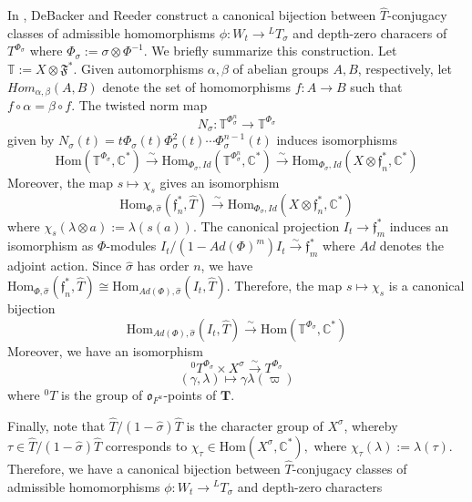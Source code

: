 \documentclass[11pt]{amsart}
\theoremstyle{plain}
\begin{document}
In \cite[Chapter 4]{debackerreeder}, DeBacker and Reeder construct a canonical bijection between $\hat{T}$-conjugacy classes of admissible homomorphisms $\phi : W_t \rightarrow {}^L T_{\sigma}$ and depth-zero characers of $T^{\Phi_{\sigma}}$ where $\Phi_{\sigma} := \sigma \otimes \Phi^{-1}$.  We briefly summarize this construction. Let $\mathbb{T} := X \otimes \mathfrak{F}^*$.  Given automorphisms $\alpha, \beta$ of abelian groups $A,B$, respectively, let $Hom_{\alpha, \beta}(A,B)$ denote the set of homomorphisms $f : A \rightarrow B$ such that $f \circ \alpha = \beta \circ f$.  The twisted norm map $$N_{\sigma} : \mathbb{T}^{\Phi_{\sigma}^n} \rightarrow \mathbb{T}^{\Phi_{\sigma}}$$ given by $N_{\sigma}(t) = t \Phi_{\sigma}(t) \Phi_{\sigma}^2(t) \cdots \Phi_{\sigma}^{n-1}(t)$ induces isomorphisms $$\mathrm{Hom}(\mathbb{T}^{\Phi_{\sigma}}, \mathbb{C}^*) \stackrel{\sim}{\rightarrow}  \mathrm{Hom}_{\Phi_{\sigma}, Id}(\mathbb{T}^{\Phi_{\sigma}^n}, \mathbb{C}^*) \stackrel{\sim}{\rightarrow} \mathrm{Hom}_{\Phi_{\sigma}, Id}(X \otimes \mathfrak{f}_n^*, \mathbb{C}^*)$$
Moreover, the map $s \mapsto \chi_s$ gives an isomorphism $$\mathrm{Hom}_{\Phi, \hat{\sigma}}(\mathfrak{f}_n^*, \hat{T}) \stackrel{\sim}{\rightarrow} \mathrm{Hom}_{\Phi_{\sigma}, Id}(X \otimes \mathfrak{f}_n^*, \mathbb{C}^*)$$ where $\chi_s(\lambda \otimes a) := \lambda(s(a))$.  The canonical projection $I_t \rightarrow \mathfrak{f}_m^*$ induces an isomorphism as $\Phi$-modules $I_t / (1 - Ad (\Phi)^m)I_t \stackrel{\sim}{\rightarrow} \mathfrak{f}_m^*$ where $Ad$ denotes the adjoint action.  Since $\hat{\sigma}$ has order $n$, we have $\mathrm{Hom}_{\Phi, \hat{\sigma}}(\mathfrak{f}_n^*, \hat{T}) \cong \mathrm{Hom}_{Ad(\Phi), \hat{\sigma}}(I_t, \hat{T})$.  Therefore, the map $s \mapsto \chi_s$ is a canonical bijection $$\mathrm{Hom}_{Ad(\Phi), \hat{\sigma}}(I_t, \hat{T}) \stackrel{\sim}{\rightarrow} \mathrm{Hom}(\mathbb{T}^{\Phi_{\sigma}}, \mathbb{C}^*)$$
Moreover, we have an isomorphism $${}^0 T^{\Phi_{\sigma}} \times X^{\sigma} \stackrel{\sim}{\rightarrow} T^{\Phi_{\sigma}}$$ $$(\gamma, \lambda) \mapsto \gamma \lambda(\varpi)$$ where ${}^0 T$ is the group of $\mathfrak{o}_{F^u}$-points of $\mathbf{T}$.

Finally, note that $\hat{T} / (1 - \hat{\sigma}) \hat{T}$ is the character group of $X^{\sigma}$, whereby $\tau \in \hat{T} / (1 - \hat{\sigma}) \hat{T}$ corresponds to $\chi_{\tau} \in \mathrm{Hom}(X^{\sigma}, \mathbb{C}^*),$ where $ \chi_{\tau}(\lambda) := \lambda(\tau)$.  Therefore, we have a canonical bijection between $\hat{T}$-conjugacy classes of admissible homomorphisms $\phi : W_t \rightarrow {}^L T_{\sigma}$ and depth-zero characters
\end{document}
